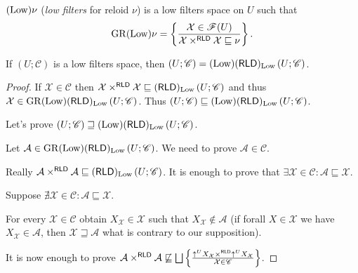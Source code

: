 \begin{defn}
  $(\operatorname{Low}) \nu$ (\emph{low filters} for reloid $\nu$) is a low filters
  space on $U$ such that
  \[ \operatorname{GR} (\operatorname{Low}) \nu = \left\{ \frac{\mathcal{X} \in \mathscr{F}(U)}{\mathcal{X} \times^{\mathsf{RLD}} \mathcal{X} \sqsubseteq \nu }\right\} . \]
\end{defn}

\begin{thm}
  If $\left( U ; \mathscr{C} \right)$ is a low filters space, then $\left( U ;
  \mathscr{C} \right) = (\operatorname{Low}) (\mathsf{RLD})_{\operatorname{Low}} \left(
  U ; \mathscr{C} \right)$.
\end{thm}

\begin{proof}
  If $\mathcal{X} \in \mathscr{C}$ then $\mathcal{X}
  \times^{\mathsf{RLD}} \mathcal{X} \sqsubseteq
  (\mathsf{RLD})_{\operatorname{Low}} \left( U ; \mathscr{C} \right)$ and thus
  $\mathcal{X} \in \operatorname{GR} (\operatorname{Low}) (\mathsf{RLD})_{\operatorname{Low}}
  \left( U ; \mathscr{C} \right)$. Thus $\left( U ; \mathscr{C} \right)
  \sqsubseteq (\operatorname{Low}) (\mathsf{RLD})_{\operatorname{Low}} \left( U ;
  \mathscr{C} \right)$.
  
  Let's prove $\left( U ; \mathscr{C} \right) \sqsupseteq (\operatorname{Low})
  (\mathsf{RLD})_{\operatorname{Low}} \left( U ; \mathscr{C} \right)$.
  
  Let $\mathcal{A} \in \operatorname{GR} (\operatorname{Low})
  (\mathsf{RLD})_{\operatorname{Low}} \left( U ; \mathscr{C} \right)$. We need
  to prove $\mathcal{A} \in \mathscr{C}$.
  
  Really $\mathcal{A} \times^{\mathsf{RLD}} \mathcal{A} \sqsubseteq
  (\mathsf{RLD})_{\operatorname{Low}} \left( U ; \mathscr{C} \right)$. It is
  enough to prove that $\exists \mathcal{X} \in \mathscr{C} : \mathcal{A}
  \sqsubseteq \mathcal{X}$.
  
  Suppose $\nexists \mathcal{X} \in \mathscr{C} : \mathcal{A} \sqsubseteq
  \mathcal{X}$.
  
  For every $\mathcal{X} \in \mathscr{C}$ obtain $X_{\mathcal{X}} \in
  \mathcal{X}$ such that $X_{\mathcal{X}} \notin \mathcal{A}$ (if forall $X \in
  \mathcal{X}$ we have $X_{\mathcal{X}} \in \mathcal{A}$, then $\mathcal{X}
  \sqsupseteq \mathcal{A}$ what is contrary to our supposition).
  
  It is now enough to prove $\mathcal{A} \times^{\mathsf{RLD}}
  \mathcal{A} \nsqsubseteq \bigsqcup \setcond{ \uparrow^U
  X_{\mathcal{X}} \times^{\mathsf{RLD}} \uparrow^U X_{\mathcal{X}}
  }{\mathcal{X} \in \mathscr{C} }$.
  

\end{proof}
